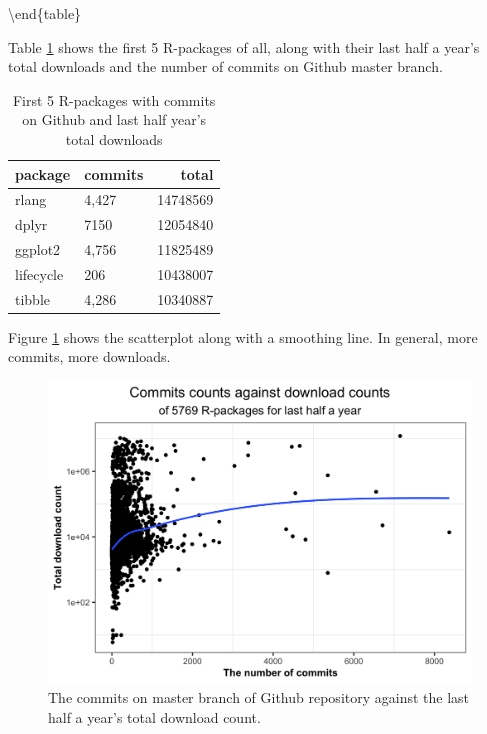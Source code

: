 \documentclass[
]{book}
\begin{document}
\textbackslash end\{table\}

Table \ref{tab:commits-tbl} shows the first 5 R-packages of all, along with their last half a year's total downloads and the number of commits on Github master branch.

\begin{table}

\caption{\label{tab:commits-tbl}First 5 R-packages with commits on Github and last half year's total downloads}
\centering
\begin{tabular}[t]{l|l|r}
\hline
package & commits & total\\
\hline
rlang & 4,427 & 14748569\\
\hline
dplyr & 7150 & 12054840\\
\hline
ggplot2 & 4,756 & 11825489\\
\hline
lifecycle & 206 & 10438007\\
\hline
tibble & 4,286 & 10340887\\
\hline
\end{tabular}
\end{table}

Figure \ref{fig:commits-pattern} shows the scatterplot along with a smoothing line. In general, more commits, more downloads.



\begin{figure}

{\centering \includegraphics{figures/commits-pattern-1} 

}

\caption{The commits on master branch of Github repository against the last half a year's total download count.}\label{fig:commits-pattern}
\end{figure}
\end{document}
